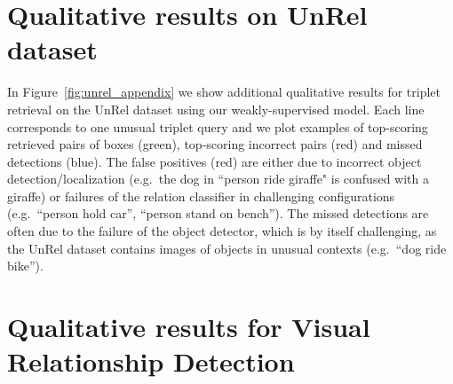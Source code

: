 \documentclass[10pt,twocolumn,letterpaper]{article}
\begin{document}
\section{Qualitative results on UnRel dataset}
\label{part:unrel}


In Figure~\ref{fig:unrel_appendix} we show additional qualitative results for triplet retrieval on the UnRel dataset using our weakly-supervised model. Each line corresponds to one unusual triplet query and we plot examples of top-scoring retrieved pairs of boxes (green), top-scoring incorrect pairs (red) and missed detections (blue). The false positives (red) are either due to incorrect object detection/localization (e.g.~the dog in ``person ride giraffe" is confused with a giraffe) or failures of the relation classifier in challenging configurations (e.g.~``person hold car'', ``person stand on bench'').
The missed detections are often due to the failure of the object detector, which is by itself challenging, as the UnRel dataset contains images of objects in unusual contexts (e.g.~``dog ride bike'').




\section{Qualitative results for Visual Relationship Detection}
\label{part:vrd}
\end{document}
